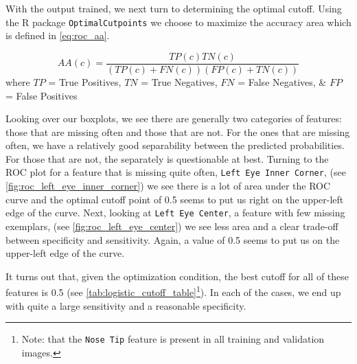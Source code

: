 \documentclass[journal]{IEEEtran}
\begin{document}

With the output trained, we next turn to determining the optimal cutoff.  Using the R package \texttt{OptimalCutpoints} we choose to maximize the accuracy area \cite{lewis2008use,greiner1995two,greiner1996two} which is defined in \cref{eq:roc_aa}.

\[\label{eq:roc_aa}
AA(c)=\frac{TP(c)TN(c)}{(TP(c)+FN(c))(FP(c)+TN(c))}
\]
where $TP$ = True Positives, $TN$ = True Negatives, $FN$ = False Negatives, \& $FP$ = False Positives

Looking over our boxplots, we see there are generally two categories of features: those that are missing often and those that are not.  For the ones that are missing often, we have a relatively good separability between the predicted probabilities.  For those that are not, the separately is questionable at best.  Turning to the ROC plot for a feature that is missing quite often, \texttt{Left Eye Inner Corner}, (see \cref{fig:roc_left_eye_inner_corner}) we see there is a lot of area under the ROC curve and the optimal cutoff point of 0.5 seems to put us right on the upper-left edge of the curve.  Next, looking at \texttt{Left Eye Center}, a feature with few missing exemplars, (see \cref{fig:roc_left_eye_center}) we see less area and a clear trade-off between specificity and sensitivity.  Again, a value of 0.5 seems to put us on the upper-left edge of the curve.

It turns out that, given the optimization condition, the best cutoff for all of these features is 0.5 (see \cref{tab:logistic_cutoff_table}\footnote{Note: that the \texttt{Nose Tip} feature is present in all training and validation images.}).  In each of the cases, we end up with quite a large sensitivity and a reasonable specificity.
\end{document}
